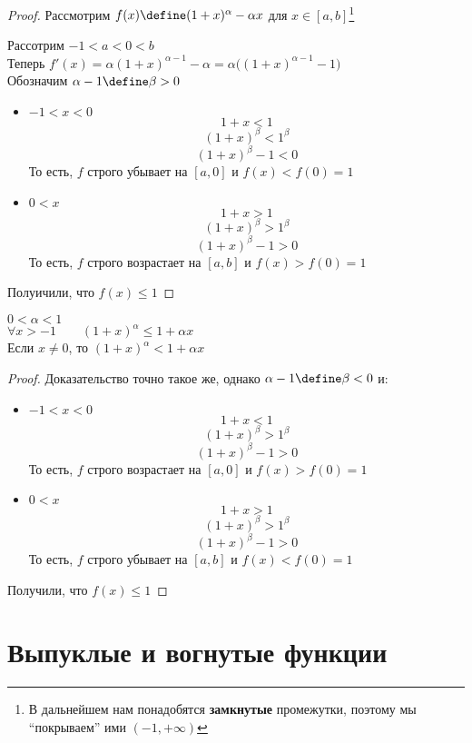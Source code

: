 \begin{proof}
    Рассмотрим $f(x) \define (1 + x)^\alpha - \alpha x $ для $ x \in [a, b] $\footnote{В дальнейшем нам понадобятся \textbf{замкнутые} промежутки, поэтому мы ``покрываем'' ими $(-1, +\infty)$}
    \item Рассотрим $ -1 < a < 0 < b $ \\
    Теперь $ f'(x) = \alpha(1 + x)^{\alpha - 1} - \alpha = \alpha \bigg( (1 + x)^{\alpha - 1} - 1 \bigg) $ \\
    Обозначим $ \alpha - 1 \define \beta > 0 $
    \begin{itemize}
        \item $ -1 < x < 0 $
        $$ 1 + x < 1 $$
        $$ (1 + x)^\beta < 1^\beta $$
        $$ (1 + x)^\beta - 1 < 0 $$
        То есть, $f$ строго убывает на $[a, 0]$ и $f(x) < f(0) = 1 $
        \item $0 < x$
        $$ 1 + x > 1 $$
        $$ (1 + x)^\beta > 1^\beta $$
        $$ (1 + x)^\beta - 1 > 0 $$
        То есть, $f$ строго возрастает на $[a, b]$ и $f(x) > f(0) = 1 $
    \end{itemize}
    Полуичили, что $f(x) \le 1$
\end{proof}

\begin{statement}
	$ 0 < \alpha < 1 $ \\
    $ \forall x > -1 \qquad (1 + x)^\alpha \le 1 + \alpha x $ \\
    Если $ x \ne 0 $, то $ (1 + x)^\alpha < 1 + \alpha x $
\end{statement}

\begin{proof}
	Доказательство точно такое же, однако $ \alpha - 1 \define \beta < 0 $ и:
    \begin{itemize}
        \item $ -1 < x < 0 $
        $$ 1 + x < 1 $$
        $$ (1 + x)^\beta > 1^\beta $$
        $$ (1 + x)^\beta - 1 > 0 $$
        То есть, $f$ строго возрастает на $[a, 0]$ и $f(x) > f(0) = 1 $
        \item $0 < x$
        $$ 1 + x > 1 $$
        $$ (1 + x)^\beta > 1^\beta $$
        $$ (1 + x)^\beta - 1 > 0 $$
        То есть, $f$ строго убывает на $[a, b]$ и $f(x) < f(0) = 1 $
    \end{itemize}
    Получили, что $f(x) \le 1 $
\end{proof}

\section{Выпуклые и вогнутые функции}

